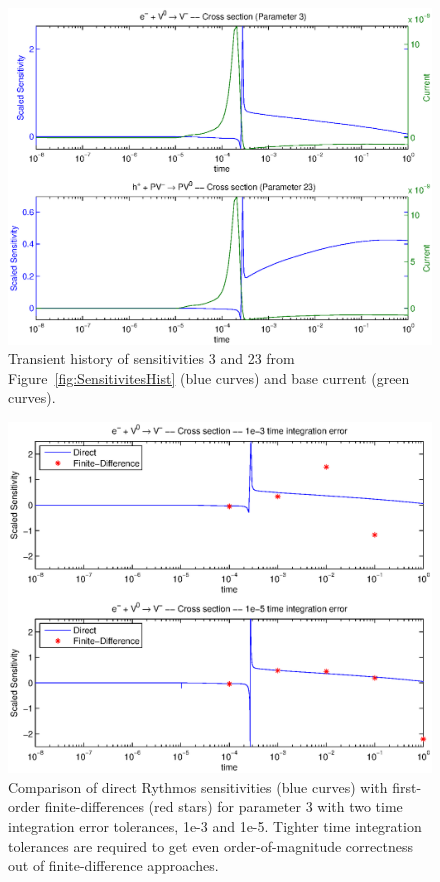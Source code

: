 \documentclass[pdf,ps2pdf,11pt]{SANDreport}
\begin{document}
{\bsinglespace
\begin{figure}[p]
\begin{center}
\includegraphics*[width=5in]{sensitivities_full_report_1}
\end{center}
\caption[Transient history of two scaled sensitivities]{
\label{fig:SensitivitesFull}
Transient history of sensitivities 3 and 23 from 
Figure~\ref{fig:SensitivitesHist} (blue curves) and base current (green curves).}

\end{figure}
\esinglespace}

{\bsinglespace
\begin{figure}[p]
\begin{center}
\includegraphics*[width=5in]{sensitivity_conv}
\end{center}
\caption[Comparison of direct and finite-difference sensitivities]{
\label{fig:SensitivitesFD}
Comparison of direct Rythmos sensitivities (blue curves) with first-order
finite-differences (red stars) for parameter 3 with two time integration error
tolerances, 1e-3 and 1e-5.  Tighter time integration tolerances are required
to get even order-of-magnitude correctness out of finite-difference
approaches.}
\end{figure}
\esinglespace}
\end{document}
